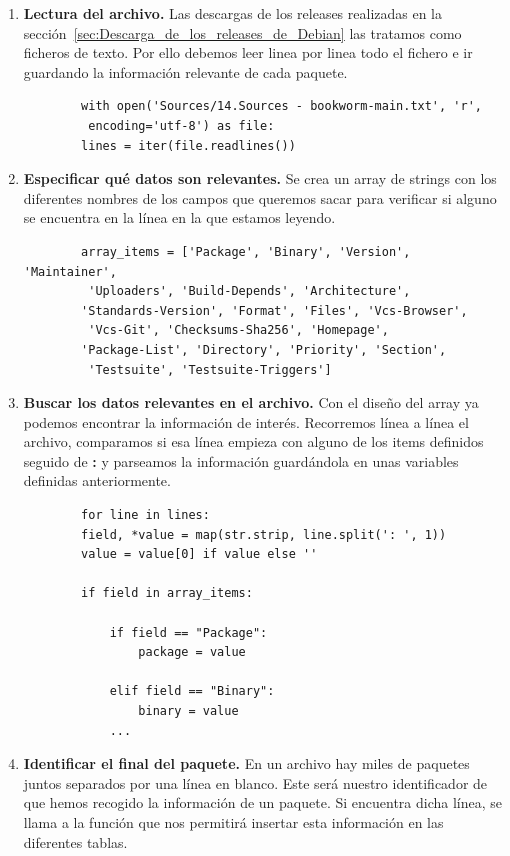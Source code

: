 \documentclass[a4paper, 12pt]{book}
\begin{document}
\begin{enumerate}
	\item \textbf{Lectura del archivo.} Las descargas de los releases realizadas en la sección~\ref{sec:Descarga_de_los_releases_de_Debian} las tratamos como ficheros de texto. Por ello debemos leer linea por linea todo el fichero e ir guardando la información relevante de cada paquete.
	
	\begin{verbatim}
		with open('Sources/14.Sources - bookworm-main.txt', 'r',
		 encoding='utf-8') as file:
		lines = iter(file.readlines())
	\end{verbatim}
	
	\item \textbf{Especificar qué datos son relevantes.} Se crea un array de strings con los diferentes nombres de los campos que queremos sacar para verificar si alguno se encuentra en la línea en la que estamos leyendo.
	
	\begin{verbatim}
		array_items = ['Package', 'Binary', 'Version', 'Maintainer',
		 'Uploaders', 'Build-Depends', 'Architecture',
		'Standards-Version', 'Format', 'Files', 'Vcs-Browser',
		 'Vcs-Git', 'Checksums-Sha256', 'Homepage',
		'Package-List', 'Directory', 'Priority', 'Section',
		 'Testsuite', 'Testsuite-Triggers']
	\end{verbatim}
	
	\item \textbf{Buscar los datos relevantes en el archivo.} Con el diseño del array ya podemos encontrar la información de interés. Recorremos línea a línea el archivo, comparamos si esa línea empieza con alguno de los items definidos seguido de \textbf{:} y parseamos la información guardándola en unas variables definidas anteriormente.
	
	\begin{verbatim}
		for line in lines:
		field, *value = map(str.strip, line.split(': ', 1))
		value = value[0] if value else ''
		
		if field in array_items:
	
			if field == "Package":
				package = value
			
			elif field == "Binary":
				binary = value
			...
	\end{verbatim}
	
		\item \textbf{Identificar el final del paquete.} En un archivo hay miles de paquetes juntos separados por una línea en blanco. Este será nuestro identificador de que hemos recogido la información de un paquete. Si encuentra dicha línea, se llama a la función que nos permitirá insertar esta información en las diferentes tablas.
		

\end{enumerate}
\end{document}
